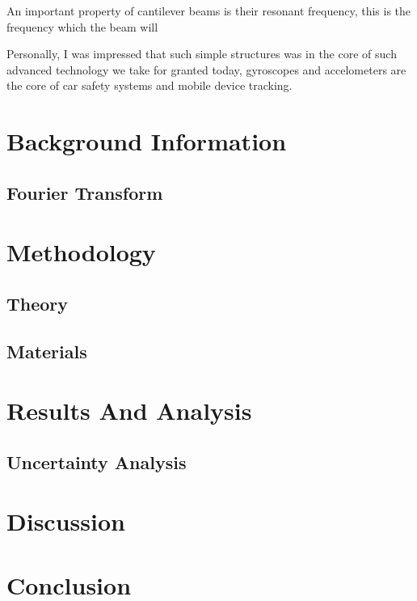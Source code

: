 \documentclass[a4paper,12pt]{article}
\begin{document}
    An important property of cantilever beams is their resonant frequency, this is the frequency which the beam will

    Personally, I was impressed that such simple structures was in the core of such advanced technology we take for granted today, gyroscopes and accelometers are the core of car safety systems and mobile device tracking.



\section{Background Information}%
    \subsection{Fourier Transform}

\section{Methodology}%
    \subsection{Theory}

    \subsection{Materials}


\section{Results And Analysis}%
    \subsection{Uncertainty Analysis}

\section{Discussion}%

\section{Conclusion}%

\printbibliography
\end{document}
